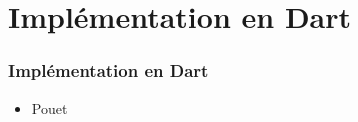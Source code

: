 \section{Implémentation en Dart}
  \begin{frame}
    \frametitle{Implémentation en Dart}
    \begin{itemize}
      \item Pouet
    \end{itemize}
  \end{frame}

